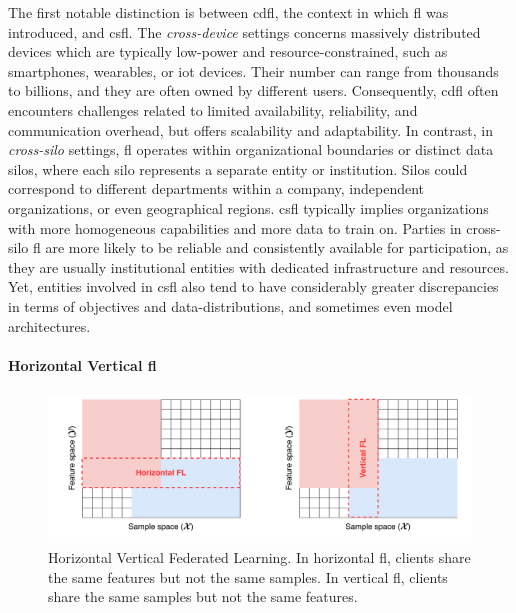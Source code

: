The first notable distinction is between \gls{cdfl}, the context in which \gls{fl} was introduced, and \gls{csfl}.
The \emph{cross-device} settings concerns massively distributed devices which are typically low-power and resource-constrained, such as smartphones, wearables, or \gls{iot} devices.
Their number can range from thousands to billions, and they are often owned by different users.
Consequently, \gls{cdfl} often encounters challenges related to limited availability, reliability, and communication overhead, but offers scalability and adaptability.
In contrast, in \emph{cross-silo} settings, \gls{fl} operates within organizational boundaries or distinct data silos, where each silo represents a separate entity or institution.
Silos could correspond to different departments within a company, independent organizations, or even geographical regions.
\gls{csfl} typically implies organizations with more homogeneous capabilities and more data to train on.
Parties in cross-silo \gls{fl} are more likely to be reliable and consistently available for participation, as they are usually institutional entities with dedicated infrastructure and resources.
Yet, entities involved in \gls{csfl} also tend to have considerably greater discrepancies in terms of objectives and data-distributions, and sometimes even model architectures.


\paragraph{Horizontal \vs Vertical \gls{fl}}

\begin{figure}
  \centering
  \includegraphics[width=.8\textwidth]{figures/horizontal-vertical.drawio.pdf}
  \caption{
    Horizontal \vs Vertical Federated Learning.
    In horizontal \gls{fl}, clients share the same features but not the same samples.
    In vertical \gls{fl}, clients share the same samples but not the same features.
    \label{fig:fl.horizontal-vertical}
  }
\end{figure}

